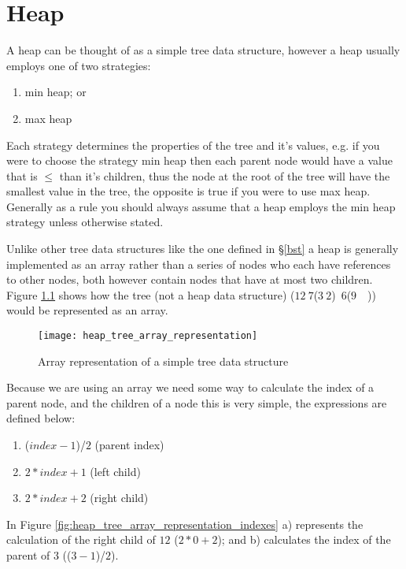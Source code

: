 \chapter{Heap}
A heap can be thought of as a simple tree data structure, however a heap usually employs one of two strategies:

\begin{enumerate}
\item min heap; or
\item max heap
\end{enumerate}

Each strategy determines the properties of the tree and it's values, e.g. if you were to choose the strategy min heap then each parent node would have a value that is $\leq$ than it's children, thus the node at the root of the tree will have the smallest value in the tree, the opposite is true if you were to use max heap. Generally as a rule you should always assume that a heap employs the min heap strategy unless otherwise stated.

Unlike other tree data structures like the one defined in \S\ref{bst} a heap is generally implemented as an array rather than a series of nodes who each have references to other nodes, both however contain nodes that have at most two children. Figure \ref{fig:tree_array_representation} shows how the tree (not a heap data structure) ($12~7$($3~2$)~$6$($9$~~)) would be represented as an array.

\begin{figure}
\begin{center}
\texttt{[image: heap\_tree\_array\_representation]}
\end{center}
\caption{Array representation of a simple tree data structure} \label{fig:tree_array_representation}
\end{figure}

Because we are using an array we need some way to calculate the index of a parent node, and the children of a node this is very simple, the expressions are defined below:

\begin{enumerate}
\item ($index - 1$)/$2$ (parent index)
\item $2 * index + 1$ (left child)
\item $2 * index + 2$ (right child)
\end{enumerate}

In Figure \ref{fig:heap_tree_array_representation_indexes} a) represents the calculation of the right child of $12$ ($2 * 0 + 2$); and b) calculates the index of the parent of $3$ (($3 - 1$)/$2$).

